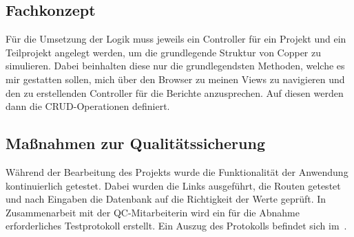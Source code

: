 \subsection{Fachkonzept}
\label{sec:Geschäftslogik}
Für die Umsetzung der Logik muss jeweils ein Controller für ein Projekt und ein Teilprojekt angelegt werden, um die grundlegende Struktur von Copper zu simulieren. Dabei beinhalten diese nur die grundlegendsten Methoden, welche es mir gestatten sollen, mich über den Browser zu meinen \acs{View}s zu navigieren und den zu erstellenden Controller für die Berichte anzusprechen. Auf diesen werden dann die \ac{CRUD}-Operationen definiert. 

\subsection{Maßnahmen zur Qualitätssicherung}
\label{sec:Qualitaetssicherung}
Während der Bearbeitung des Projekts wurde die Funktionalität der Anwendung kontinuierlich getestet. Dabei wurden die Links ausgeführt, die Routen getestet und nach Eingaben die Datenbank auf die Richtigkeit der Werte geprüft. In Zusammenarbeit mit der \ac{QC}-Mitarbeiterin wird ein für die Abnahme erforderliches Testprotokoll erstellt. Ein Auszug des Protokolls befindet sich im~.

